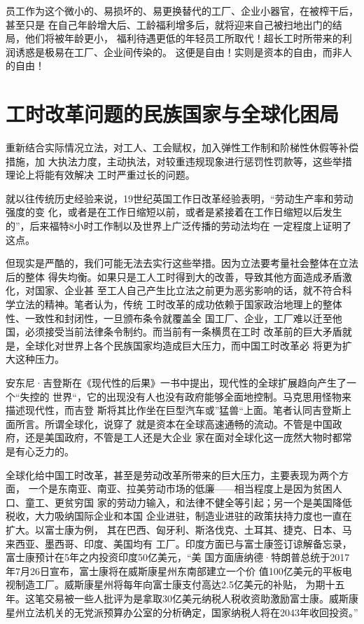 员工作为这个微小的、易损坏的、易更换替代的工厂、企业小器官，在被榨干后，甚至只是
在自己年龄增大后、工龄福利增多后，就将迎来自己被扫地出门的结局，他们将被年龄更小，
福利待遇更低的年轻员工所取代！超长工时所带来的利润诱惑是极易在工厂、企业间传染的。
这便是自由！实则是资本的自由，而非人的自由！

\section{工时改革问题的民族国家与全球化困局}

重新结合实际情况立法，对工人、工会赋权，加入弹性工作制和阶梯性休假等补偿措施，加
大执法力度，主动执法，对较重违规现象进行惩罚性罚款等，这些举措理论上将能有效解决
工时严重过长的问题。

就以往传统历史经验来说，19世纪英国工作日改革经验表明，“劳动生产率和劳动强度的变
化，或者是在工作日缩短以前，或者是紧接着在工作日缩短以后发生
的”，后来福特8小时工作制以及世界上广泛传播的劳动法均在
一定程度上证明了这点。

但现实是严酷的，我们可能无法去实行这些举措。因为立法要考量社会整体在立法后的整体
得失均衡。如果只是工人工时得到大的改善，导致其他方面造成矛盾激化，对国家、企业甚
至工人自己产生比立法之前更为恶劣影响的话，就不符合科学立法的精神。笔者认为，传统
工时改革的成功依赖于国家政治地理上的整体性、一致性和封闭性，一旦颁布条令就覆盖全
国工厂、企业，工厂难以迁至他国，必须接受当前法律条令制约。而当前有一条横贯在工时
改革前的巨大矛盾就是，全球化对世界上各个民族国家均造成巨大压力，而中国工时改革必
将更为扩大这种压力。

安东尼·吉登斯在《现代性的后果》一书中提出，现代性的全球扩展趋向产生了一个“失控的
世界“，它的出现没有人也没有政府能够全面地控制。马克思用怪物来描述现代性，而吉登
斯将其比作坐在巨型汽车或”猛兽“上面。笔者认同吉登斯上面所言。所谓全球化，说穿了
就是资本在全球高速通畅的流动。不管是中国政府，还是美国政府，不管是工人还是大企业
家在面对全球化这一庞然大物时都常是有心乏力的。

全球化给中国工时改革，甚至是劳动改革所带来的巨大压力，主要表现为两个方面，
一个是东南亚、南亚、拉美劳动市场的低廉——相当程度上是因为贫困人口、童工、更贫穷国
家的劳动力输入，和法律不健全等引起；另一个是美国降低税收，大力吸纳国际企业和本国
企业进驻，制造业进驻的政策扶持力度也一直在扩大。以富士康\cite{foxconnwiki}为例，
其在巴西、匈牙利、斯洛伐克、土耳其、捷克、日本、马来西亚、墨西哥、印度、美国均有
工厂。印度方面已与富士康签订谅解备忘录，富士康预计在5年之内投资印度50亿美元，“美
国方面唐纳德·特朗普总统于2017年7月26日宣布，富士康将在威斯康星州东南部建立一个价
值100亿美元的平板电视制造工厂。威斯康星州将每年向富士康支付高达2.5亿美元的补贴，
为期十五年。这笔交易被一些人批评为是拿取30亿美元纳税人税收资助激励富士康。威斯康
星州立法机关的无党派预算办公室的分析确定，国家纳税人将在2043年收回投资。”

